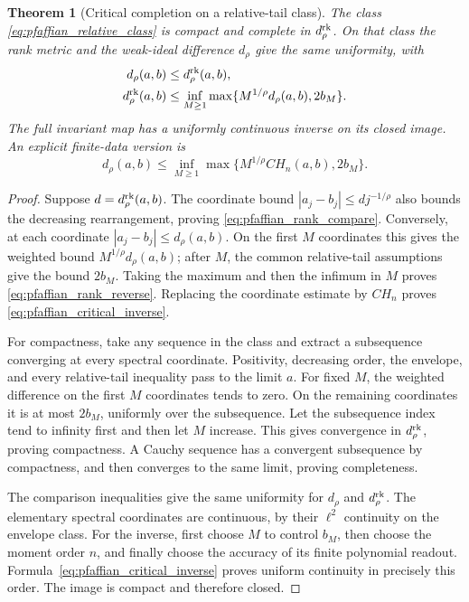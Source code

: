 \documentclass[11pt,a4paper]{amsart}
\numberwithin{equation}{section}
\newtheorem{theorem}{Theorem}[section]
\theoremstyle{definition}
\theoremstyle{remark}
\begin{document}
\begin{theorem}[Critical completion on a relative-tail class]\label{thm:pfaffian_critical}
The class \eqref{eq:pfaffian_relative_class} is compact and complete in $d_\rho^{\rm rk}$. On that class the rank metric and the weak-ideal difference $d_\rho$ give the same uniformity, with
\begin{align}
 d_\rho(a,b)&\le d_\rho^{\rm rk}(a,b),\label{eq:pfaffian_rank_compare}\\
 d_\rho^{\rm rk}(a,b)&\le\inf_{M\ge1}
    \max\{M^{1/\rho}d_\rho(a,b),2b_M\}.
 \label{eq:pfaffian_rank_reverse}
\end{align}
The full invariant map has a uniformly continuous inverse on its closed image. An explicit finite-data version is
\begin{equation}\label{eq:pfaffian_critical_inverse}
 d_\rho(a,b)\le\inf_{M\ge1}
     \max\{M^{1/\rho}CH_n(a,b),2b_M\}.
\end{equation}
\end{theorem}
\begin{proof}
Suppose $d=d_\rho^{\rm rk}(a,b)$. The coordinate bound $|a_j-b_j|\le dj^{-1/\rho}$ also bounds the decreasing rearrangement, proving \eqref{eq:pfaffian_rank_compare}. Conversely, at each coordinate $|a_j-b_j|\le d_\rho(a,b)$. On the first $M$ coordinates this gives the weighted bound $M^{1/\rho}d_\rho(a,b)$; after $M$, the common relative-tail assumptions give the bound $2b_M$. Taking the maximum and then the infimum in $M$ proves \eqref{eq:pfaffian_rank_reverse}. Replacing the coordinate estimate by $CH_n$ proves \eqref{eq:pfaffian_critical_inverse}.

For compactness, take any sequence in the class and extract a subsequence converging at every spectral coordinate. Positivity, decreasing order, the envelope, and every relative-tail inequality pass to the limit $a$. For fixed $M$, the weighted difference on the first $M$ coordinates tends to zero. On the remaining coordinates it is at most $2b_M$, uniformly over the subsequence. Let the subsequence index tend to infinity first and then let $M$ increase. This gives convergence in $d_\rho^{\rm rk}$, proving compactness. A Cauchy sequence has a convergent subsequence by compactness, and then converges to the same limit, proving completeness.

The comparison inequalities give the same uniformity for $d_\rho$ and $d_\rho^{\rm rk}$. The elementary spectral coordinates are continuous, by their $\ell^2$ continuity on the envelope class. For the inverse, first choose $M$ to control $b_M$, then choose the moment order $n$, and finally choose the accuracy of its finite polynomial readout. Formula~\eqref{eq:pfaffian_critical_inverse} proves uniform continuity in precisely this order. The image is compact and therefore closed.
\end{proof}
\end{document}
